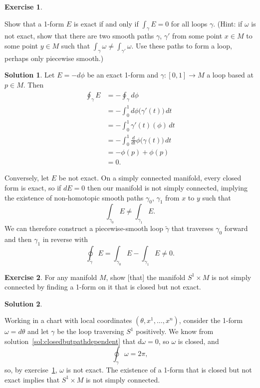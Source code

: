 \documentclass[11pt, a4paper]{report}
\theoremstyle{definition}
\newtheorem{ex}{Exercise}[part]
\newtheorem{sol}{Solution}[part]
\begin{document}
\begin{ex}\label{ex:exactifintegraloverloopiszero}

Show that a 1-form $E$ is exact if and only if $\int_\gamma E = 0$ for all loops $\gamma$. (Hint: if $\omega$ is not exact, show that there are two smooth paths $\gamma$, $\gamma'$ from some point $x \in M$ to some point $y \in M$ such that $\int_\gamma \omega \neq \int_{\gamma'} \omega$. Use these paths to form a loop, perhaps only piecewise smooth.)

\end{ex}

\begin{sol}

Let $E = -d\phi$ be an exact 1-form and $\gamma: [0, 1] \to M$ a loop based at $p \in M$. Then
\begin{align*}
    \oint_\gamma E &= - \oint_\gamma d\phi \\
                   &= - \int_0^1 d\phi \bigl( \gamma'(t) \bigr) \, dt \\
                   &= - \int_0^1 \gamma'(t)(\phi) \, dt \\
                   &= - \int_0^1 \frac{d}{dt} \phi \bigl( \gamma(t) \bigr) \, dt \\
                   &= - \phi(p) + \phi(p) \\
                   &= 0.
\end{align*}

Conversely, let $E$ be not exact. On a simply connected manifold, every closed form is exact, so if $dE = 0$ then our manifold is not simply connected, implying the existence of non-homotopic smooth paths $\gamma_0$, $\gamma_1$ from $x$ to $y$ such that
\[
    \int_{\gamma_0} E \neq \int_{\gamma_1} E.
\]
We can therefore construct a piecewise-smooth loop $\tilde{\gamma}$ that traverses $\gamma_0$ forward and then $\gamma_1$ in reverse with
\[
    \oint_{\tilde{\gamma}} E = \int_{\gamma_0} E - \int_{\gamma_1} E \neq 0.
\]

\end{sol}

\begin{ex}

For any manifold $M$, show [that] the manifold $S^1 \times M$ is not simply connected by finding a 1-form on it that is closed but not exact.

\end{ex}

\begin{sol}\label{sol:s1productnotsimplyconnected}

Working in a chart with local coordinates $(\theta, x^1, \ldots, x^n)$, consider the 1-form $\omega = d\theta$ and let $\gamma$ be the loop traversing $S^1$ positively.
We know from solution~\ref{sol:closedbutpathdependent} that $d \omega = 0$, so $\omega$ is closed, and
\[
    \oint_\gamma \omega = 2 \pi,
\]
so, by exercise~\ref{ex:exactifintegraloverloopiszero}, $\omega$ is not exact.
The existence of a 1-form that is closed but not exact implies that $S^1 \times M$ is not simply connected.

\end{sol}
\end{document}
